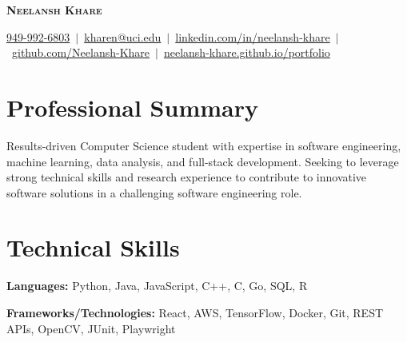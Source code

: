 \documentclass[letterpaper,11pt]{article}
\begin{document}
\begin{center}  
  \textbf{\Large \scshape Neelansh Khare} \\ \vspace{1pt}
  \color{blue}
  \begin{minipage}{1.05\textwidth}
  \centering
  \small \href{tel:19499926803}{{949-992-6803}}~$|$~\href{mailto:kharen@uci.edu}{{kharen@uci.edu}}~$|$~\href{https://linkedin.com/in/neelansh-khare}{{linkedin.com/in/neelansh-khare}}~$|$~\href{https://github.com/Neelansh-Khare}{{github.com/Neelansh-Khare}}~$|$~\href{https://neelansh-khare.github.io/portfolio/}{{neelansh-khare.github.io/portfolio}}
  \end{minipage}
\end{center}
\section{Professional Summary}
\begin{itemize}[leftmargin=0.15in, label={}, itemsep=0pt]
\small{\item{
  Results-driven Computer Science student with expertise in software engineering, machine learning, data analysis, and full-stack development. Seeking to leverage strong technical skills and research experience to contribute to innovative software solutions in a challenging software engineering role.
}}
\end{itemize}

\section{Technical Skills}
\begin{itemize}[leftmargin=0.15in, label={}, itemsep=0pt]
\small{\item{
 \textbf{Languages:} Python, Java, JavaScript, C++, C, Go, SQL, R
}}
\small{\item{
 \textbf{Frameworks/Technologies:} React, AWS, TensorFlow, Docker, Git, REST APIs, OpenCV, JUnit, Playwright
}}
\end{itemize}

\end{document}

